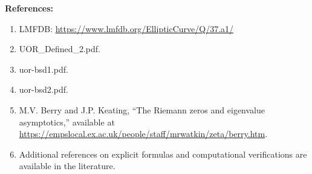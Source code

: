 \documentclass[11pt]{article}
\begin{document}
\bigskip

\noindent \textbf{References:}
\begin{enumerate}
  \item LMFDB: \url{https://www.lmfdb.org/EllipticCurve/Q/37.a1/}
  \item UOR\_Defined\_2.pdf.
  \item uor-bsd1.pdf.
  \item uor-bsd2.pdf.
  \item M.V. Berry and J.P. Keating, ``The Riemann zeros and eigenvalue asymptotics,'' available at \url{https://empslocal.ex.ac.uk/people/staff/mrwatkin/zeta/berry.htm}.
  \item Additional references on explicit formulas and computational verifications are available in the literature.
\end{enumerate}
\end{document}
